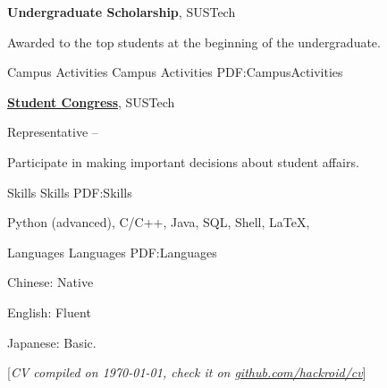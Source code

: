 \documentclass[a4paper,MMMyyyy,nonstopmode]{simpleresumecv}
\newcommand{\CVNote}{CV compiled on {\today}, check it on \href{https://github.com/hackroid/cv}{github.com/hackroid/cv}}
\begin{document}
\begin{Body}
    \Gap
    \BulletItem
    \textbf{Undergraduate Scholarship},
    SUSTech
    \hfill
    \begin{Detail}
        \Item
        Awarded to the top students at the beginning of the undergraduate.
    \end{Detail}



    \Section
    {Campus Activities}
    {Campus Activities}
    {PDF:CampusActivities}

    \Entry
    \href{https://www.sustech.edu.cn/en/campus-life.html?lang=en}
    {\textbf{Student Congress}},
    SUSTech

    \Gap
    \BulletItem
    Representative
    \hfill
     --
    \begin{Detail}
        \SubBulletItem
        Participate in making important decisions about student affairs.
    \end{Detail}



    \Section
    {Skills}
    {Skills}
    {PDF:Skills}

    \Entry
    \BulletItem
    Python (advanced),
    C/C++,
    Java,
    SQL,
    Shell,
    {\LaTeX},



    \Section
    {Languages}
    {Languages}
    {PDF:Languages}

    \BulletItem
    Chinese: Native

    \Gap
    \BulletItem
    English: Fluent

    \Gap
    \BulletItem
    Japanese: Basic.







\end{Body}


\BigGap
\UseNoteFont%
\null\hfill%
[\textit{\CVNote}]
\end{document}

